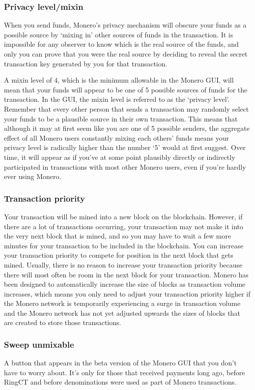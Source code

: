 \subsubsection{Privacy level/mixin}
When you send funds, Monero's privacy mechanism will obscure your funds as a possible source by `mixing in' other sources of funds in the transaction. It is impossible for any observer to know which is the real source of the funds, and only you can prove that you were the real source by deciding to reveal the secret transaction key generated by you for that transaction. \par
A mixin level of 4, which is the minimum allowable in the Monero GUI, will mean that your funds will appear to be one of 5 possible sources of funds for the transaction. In the GUI, the mixin level is referred to as the `privacy level'. Remember that every other person that sends a transaction may randomly select your funds to be a plausible source in their own transaction. This means that although it may at first seem like you are one of 5 possible senders, the aggregate effect of all Monero users constantly mixing each others' funds means your privacy level is radically higher than the number `5' would at first suggest. Over time, it will appear as if you've at some point plausibly directly or indirectly participated in transactions with most other Monero users, even if you're hardly ever using Monero.
\subsubsection{Transaction priority}
	Your transaction will be mined into a new block on the blockchain. However, if there are a lot of transactions occurring, your transaction may not make it into the very next block that is mined, and so you may have to wait a few more minutes for your transaction to be included in the blockchain. You can increase your transaction priority to compete for position in the next block that gets mined. Usually, there is no reason to increase your transaction priority because there will most often be room in the next block for your transaction. Monero has been designed to automatically increase the size of blocks as transaction volume increases, which means you only need to adjust your transaction priority higher if the Monero network is temporarily experiencing a surge in transaction volume and the Monero network has not yet adjusted upwards the sizes of blocks that are created to store those transactions.
\subsubsection{Sweep unmixable}
	A button that appears in the beta version of the Monero GUI that you don't have to worry about. It's only for those that received payments long ago, before RingCT and before denominations were used as part of Monero transactions.
